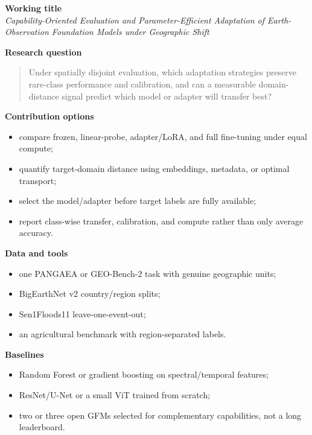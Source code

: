 \documentclass[
  a4paper,
  11pt]{article}
\providecommand{\tightlist}{%
  \setlength{\itemsep}{0pt}\setlength{\parskip}{0pt}}
\begin{document}
\textbf{Working title}\\
\emph{Capability-Oriented Evaluation and Parameter-Efficient Adaptation
of Earth-Observation Foundation Models under Geographic Shift}

\textbf{Research question}

\begin{quote}
Under spatially disjoint evaluation, which adaptation strategies
preserve rare-class performance and calibration, and can a measurable
domain-distance signal predict which model or adapter will transfer
best?
\end{quote}

\textbf{Contribution options}

\begin{itemize}
\tightlist
\item
  compare frozen, linear-probe, adapter/LoRA, and full fine-tuning under
  equal compute;
\item
  quantify target-domain distance using embeddings, metadata, or optimal
  transport;
\item
  select the model/adapter before target labels are fully available;
\item
  report class-wise transfer, calibration, and compute rather than only
  average accuracy.
\end{itemize}

\textbf{Data and tools}

\begin{itemize}
\tightlist
\item
  one PANGAEA or GEO-Bench-2 task with genuine geographic units;
\item
  BigEarthNet v2 country/region splits;
\item
  Sen1Floods11 leave-one-event-out;
\item
  an agricultural benchmark with region-separated labels.
\end{itemize}

\textbf{Baselines}

\begin{itemize}
\tightlist
\item
  Random Forest or gradient boosting on spectral/temporal features;
\item
  ResNet/U-Net or a small ViT trained from scratch;
\item
  two or three open GFMs selected for complementary capabilities, not a
  long leaderboard.
\end{itemize}
\end{document}
